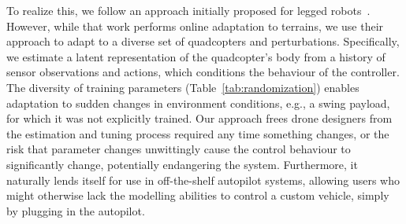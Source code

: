 To realize this, we follow an approach initially proposed for legged robots~\cite{kumar2021rma}. However, while that work performs online adaptation to terrains, we use their approach to adapt to a diverse set of quadcopters and perturbations. Specifically, we estimate a latent representation of the quadcopter's body from a history of sensor observations and actions, which conditions the behaviour of the controller.
%
%
%
The diversity of training parameters (Table~\ref{tab:randomization}) enables adaptation to sudden changes in environment conditions, e.g., a swing payload, for which it was not explicitly trained.
%
Our approach frees drone designers from the estimation and tuning process required any time something changes, or the risk that parameter changes unwittingly cause the control behaviour to significantly change, potentially endangering the system.
%
Furthermore, it naturally lends itself for use in off-the-shelf autopilot systems, allowing users who might otherwise lack the modelling abilities to control a custom vehicle, simply by plugging in the autopilot.




